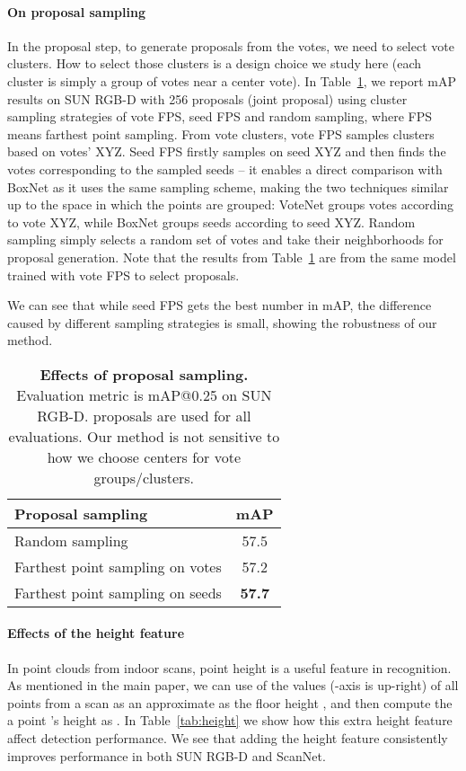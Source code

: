 \documentclass[10pt,twocolumn,letterpaper]{article}
\newcommand\votenet{VoteNet}
\begin{document}
\paragraph{On proposal sampling}
In the proposal step, to generate  proposals from the votes, we need to select  vote clusters. How to select those clusters is a design choice we study here (each cluster is simply a group of votes near a center vote). In Table~\ref{tab:sampling}, we report mAP results on SUN RGB-D with 256 proposals (joint proposal) using cluster sampling strategies of vote FPS, seed FPS and random sampling, where FPS means farthest point sampling. From  vote clusters, vote FPS samples  clusters based on votes' XYZ. Seed FPS firstly samples on seed XYZ and then finds the votes corresponding to the sampled seeds -- it enables a direct comparison with BoxNet as it uses the same sampling scheme, making the two techniques similar up to the space in which the points are grouped: \votenet{} groups votes according to vote XYZ, while BoxNet groups seeds according to seed XYZ. Random sampling simply selects a random set of  votes and take their neighborhoods for proposal generation. Note that the results from Table~\ref{tab:sampling} are from the same model trained with vote FPS to select proposals.

We can see that while seed FPS gets the best number in mAP, the difference caused by different sampling strategies is small, showing the robustness of our method.

\begin{table}[]
    \begin{center}
    \begin{tabular}{l|c}
    \toprule
        Proposal sampling & mAP \\ \midrule
        Random sampling & 57.5\\ Farthest point sampling on votes & 57.2\\ Farthest point sampling on seeds & \textbf{57.7}\\ 
        \bottomrule
    \end{tabular}
    \end{center}
    \caption{\textbf{Effects of proposal sampling.} Evaluation metric is mAP@0.25 on SUN RGB-D.  proposals are used for all evaluations. Our method is not sensitive to how we choose centers for vote groups/clusters.}
    \label{tab:sampling}
\end{table}

\paragraph{Effects of the height feature}
In point clouds from indoor scans, point height is a useful feature in recognition. As mentioned in the main paper, we can use  of the  values (-axis is up-right) of all points from a scan as an approximate as the floor height , and then compute the a point 's height as . In Table~\ref{tab:height} we show how this extra height feature affect detection performance. We see that adding the height feature consistently improves performance in both SUN RGB-D and ScanNet.
\end{document}
